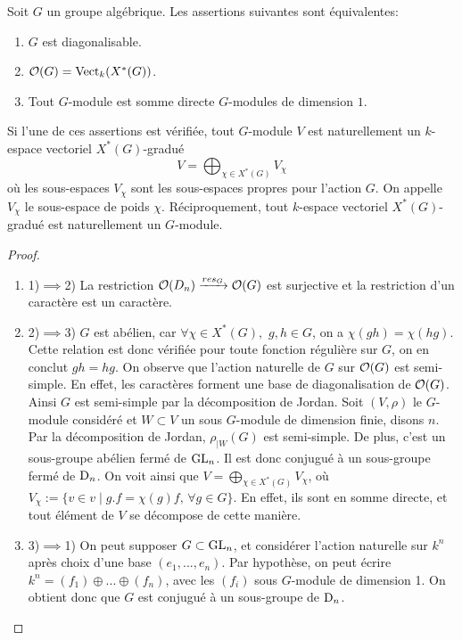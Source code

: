 \begin{prop}\label{GroupeDiagCarac}
Soit $G$ un groupe algébrique. Les assertions suivantes sont équivalentes:
\begin{enumerate}
\item $G$ est diagonalisable.
\item $\mathcal{O}(G)=\operatorname{Vect}_k(X^*(G))$.
\item Tout $G$-module est somme directe $G$-modules de dimension $1$.
\end{enumerate}
Si l'une de ces assertions est vérifiée, tout $G$-module $V$ est naturellement un $k$-espace vectoriel $X^*(G)$-gradué
$$V=\bigoplus_{\chi \in X^*(G)}V_{\chi}$$
où les sous-espaces $V_{\chi}$ sont les sous-espaces propres pour l'action $G$. On appelle $V_{\chi}$ le sous-espace de poids $\chi$. Réciproquement, tout $k$-espace vectoriel $X^*(G)$-gradué est naturellement un $G$-module.
\end{prop}
\begin{proof}
\begin{enumerate}
\item 1)$\implies$2) La restriction $\mathcal{O}(D_n)\xrightarrow{res_G} \mathcal{O}(G)$ est surjective et la restriction d'un caractère est un caractère.
\item 2)$\implies$3) $G$ est abélien, car $\forall \chi\in X^*(G),\,\,g,h\in G$, on a $\chi(gh)=\chi(hg)$. Cette relation est donc vérifiée pour toute fonction régulière sur $G$, on en conclut $gh=hg$. On observe que l'action naturelle de $G$ sur $\mathcal{O}(G)$ est semi-simple. En effet, les caractères forment une base de diagonalisation de $\mathcal{O}(G)$. Ainsi $G$ est semi-simple par la décomposition de Jordan. Soit $(V,\rho)$ le $G$-module considéré et $W\subset V$ un sous $G$-module de dimension finie, disons $n$. Par la décomposition de Jordan,  $\rho_{|W}(G)$ est semi-simple. De plus, c'est un sous-groupe abélien fermé de $\operatorname{GL}_n$. Il est donc conjugué à un sous-groupe fermé de $\operatorname{D}_n$. On voit ainsi que $V=\bigoplus_{\chi \in X^*(G)}V_\chi$, où $V_\chi:=\lbrace v\in v\mid g.f=\chi(g)f,\, \forall g\in G \rbrace$. En effet, ils sont en somme directe, et tout élément de $V$ se décompose de cette manière.
\item 3)$\implies$1) On peut supposer $G\subset \operatorname{GL}_n$, et considérer l'action naturelle sur $k^n$ après choix d'une base $(e_1,...,e_n)$. Par hypothèse, on peut écrire $k^n=(f_1)\oplus...\oplus (f_n)$, avec les $(f_i)$ sous $G$-module de dimension 1. On obtient donc que $G$ est conjugué à un sous-groupe de $\operatorname{D}_n$.
\end{enumerate}
\end{proof}



